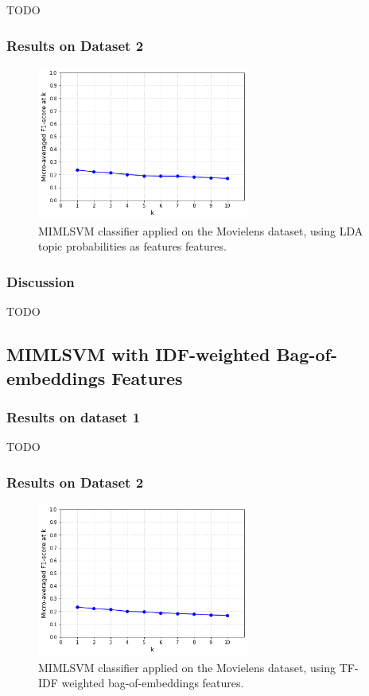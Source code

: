 {\color{red} TODO}

\subsubsection{Results on Dataset 2}

\begin{figure}[H]
    \centering
    \includegraphics[width=7cm]{chapters/05_experiments/images/movielens-mimlsvm-lda.png}
    \caption{MIMLSVM classifier applied on the Movielens dataset, using LDA topic probabilities as features features.}
    \label{fig:movielens_mimlsvm_lda}
\end{figure}

\subsubsection{Discussion}

{\color{red} TODO}

\subsection{MIMLSVM with IDF-weighted Bag-of-embeddings Features}

\subsubsection{Results on dataset 1}

{\color{red} TODO}

\subsubsection{Results on Dataset 2}

\begin{figure}[H]
    \centering
    \includegraphics[width=7cm]{chapters/05_experiments/images/movielens-mimlsvm-embeddings.png}
    \caption{MIMLSVM classifier applied on the Movielens dataset, using TF-IDF weighted bag-of-embeddings features.}
    \label{fig:knn_lda_movielens}
\end{figure}

